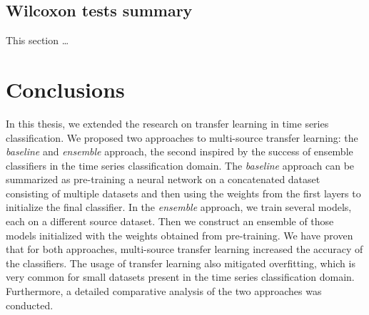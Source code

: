 \documentclass[a4paper,11pt,twoside]{report}
\theoremstyle{definition}
\begin{document}
\section{Wilcoxon tests summary}
This section \dots %

\begin{table}[!h]
\caption{Summary of statistical tests.}
\centering
\tabcolsep=0.11cm
\label{table:tests}
\end{table}
\chapter{Conclusions}

In this thesis, we extended the research on transfer learning in time series classification. We proposed two approaches to multi-source transfer learning: the \textit{baseline} and \textit{ensemble} approach, the second inspired by the success of ensemble classifiers in the time series classification domain. The \textit{baseline} approach can be summarized as pre-training a neural network on a concatenated dataset consisting of multiple datasets and then using the weights from the first layers to initialize the final classifier. In the \textit{ensemble} approach, we train several models, each on a different source dataset. Then we construct an ensemble of those models initialized with the weights obtained from pre-training. We have proven that for both approaches, multi-source transfer learning increased the accuracy of the classifiers. The usage of transfer learning also mitigated overfitting, which is very common for small datasets present in the time series classification domain. Furthermore, a detailed comparative analysis of the two approaches was conducted.
\end{document}
